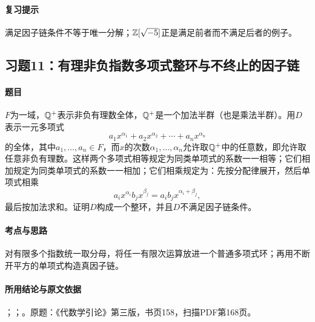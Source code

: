 \paragraph{复习提示}

满足因子链条件不等于唯一分解；$\mathbb Z[\sqrt{-5}]$正是满足前者而不满足后者的例子。

\subsection{习题11：有理非负指数多项式整环与不终止的因子链}

\label{ex:4:11}

\paragraph{题目}

$F$为一域，$\mathbb Q^+$表示非负有理数全体，$\mathbb Q^+$是一个加法半群（也是乘法半群）。用$D$表示一元多项式
\[
a_1x^{\alpha_1}+a_2x^{\alpha_2}+\cdots+a_nx^{\alpha_n}
\]
的全体，其中$a_1,\ldots,a_n\in F$，而$x$的次数$\alpha_1,\ldots,\alpha_n$允许取$\mathbb Q^+$中的任意数，即允许取任意非负有理数。这样两个多项式相等规定为同类单项式的系数一一相等；它们相加规定为同类单项式的系数一一相加；它们相乘规定为：先按分配律展开，然后单项式相乘
\[
a_ix^{\alpha_i}b_jx^{\beta_j}=a_ib_jx^{\alpha_i+\beta_j},
\]
最后按加法求和。证明$D$构成一个整环，并且$D$不满足因子链条件。

\paragraph{考点与思路}

对有限多个指数统一取分母，将任一有限次运算放进一个普通多项式环；再用不断开平方的单项式构造真因子链。

\paragraph{所用结论与原文依据}

；；。原题：《代数学引论》第三版，书页158，扫描PDF第168页。


